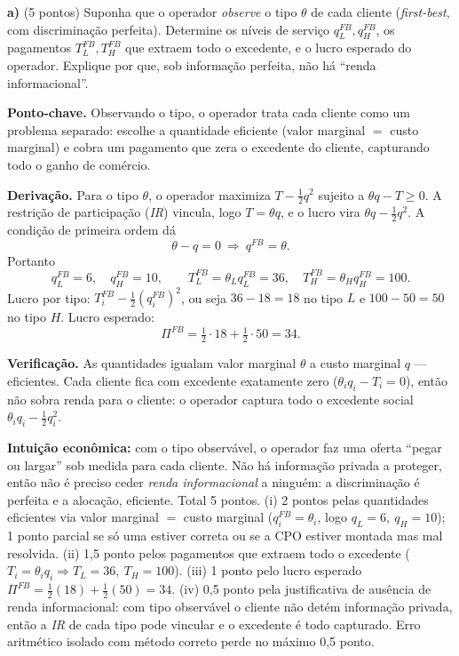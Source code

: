\textbf{a)} (5 pontos) Suponha que o operador \emph{observe} o tipo $\theta$ de cada cliente (\emph{first-best}, com discriminação perfeita). Determine os níveis de serviço $q_L^{FB}, q_H^{FB}$, os pagamentos $T_L^{FB}, T_H^{FB}$ que extraem todo o excedente, e o lucro esperado do operador. Explique por que, sob informação perfeita, não há ``renda informacional''.
\resolucaobox{7.2cm}
\begin{solucao}
\textbf{Ponto-chave.} Observando o tipo, o operador trata cada cliente como um problema separado: escolhe a quantidade eficiente (valor marginal $=$ custo marginal) e cobra um pagamento que zera o excedente do cliente, capturando todo o ganho de comércio.

\textbf{Derivação.} Para o tipo $\theta$, o operador maximiza $T - \tfrac{1}{2}q^2$ sujeito a $\theta q - T \ge 0$. A restrição de participação (\emph{IR}) vincula, logo $T = \theta q$, e o lucro vira $\theta q - \tfrac{1}{2}q^2$. A condição de primeira ordem dá
\[
\theta - q = 0 \ \Longrightarrow\ q^{FB} = \theta.
\]
Portanto
\[
q_L^{FB} = 6, \quad q_H^{FB} = 10, \qquad
T_L^{FB} = \theta_L q_L^{FB} = 36, \quad T_H^{FB} = \theta_H q_H^{FB} = 100.
\]
Lucro por tipo: $T_i^{FB} - \tfrac{1}{2}(q_i^{FB})^2$, ou seja $36 - 18 = 18$ no tipo $L$ e $100 - 50 = 50$ no tipo $H$. Lucro esperado:
\[
\Pi^{FB} = \tfrac{1}{2}\cdot 18 + \tfrac{1}{2}\cdot 50 = 34.
\]

\textbf{Verificação.} As quantidades igualam valor marginal $\theta$ a custo marginal $q$ --- eficientes. Cada cliente fica com excedente exatamente zero ($\theta_i q_i - T_i = 0$), então não sobra renda para o cliente: o operador captura todo o excedente social $\theta_i q_i - \tfrac{1}{2}q_i^2$.

\textbf{Intuição econômica:} com o tipo observável, o operador faz uma oferta ``pegar ou largar'' sob medida para cada cliente. Não há informação privada a proteger, então não é preciso ceder \emph{renda informacional} a ninguém: a discriminação é perfeita e a alocação, eficiente.
\rubricalabel
Total 5 pontos. (i) 2 pontos pelas quantidades eficientes via valor marginal $=$ custo marginal ($q_i^{FB}=\theta_i$, logo $q_L=6,\ q_H=10$); 1 ponto parcial se só uma estiver correta ou se a CPO estiver montada mas mal resolvida. (ii) 1{,}5 ponto pelos pagamentos que extraem todo o excedente ($T_i=\theta_i q_i \Rightarrow T_L=36,\ T_H=100$). (iii) 1 ponto pelo lucro esperado $\Pi^{FB}=\tfrac{1}{2}(18)+\tfrac{1}{2}(50)=34$. (iv) 0{,}5 ponto pela justificativa de ausência de renda informacional: com tipo observável o cliente não detém informação privada, então a \emph{IR} de cada tipo pode vincular e o excedente é todo capturado. Erro aritmético isolado com método correto perde no máximo 0{,}5 ponto.
\end{solucao}

